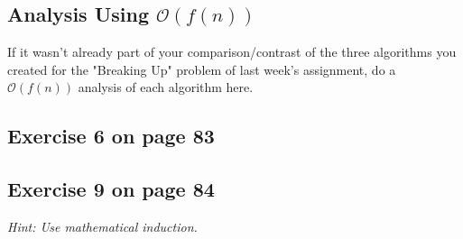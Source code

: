 \documentclass[12pt]{amsart}
\begin{document}
\subsection{Analysis Using $\mathcal{O}(f(n))$}
   If it wasn't already part of your comparison/contrast of the three algorithms
  you created for the "Breaking Up" problem of last week's assignment, do a
  $\mathcal{O}(f(n))$ analysis of each algorithm here.

\subsection{Exercise 6 on page 83}


\subsection{Exercise 9 on page 84} $ $\\ 

   \textit{Hint: Use mathematical induction.}
\end{document}
